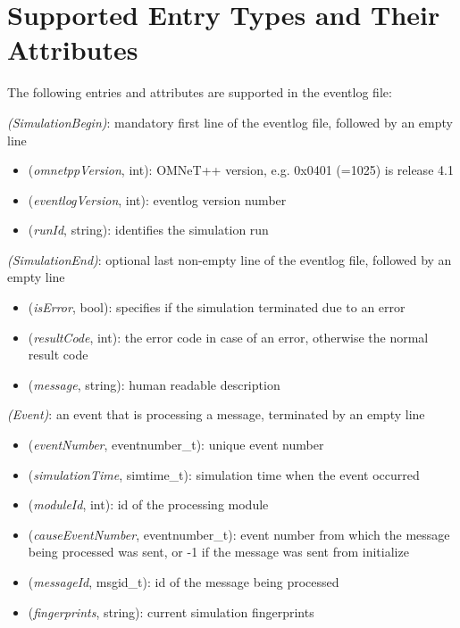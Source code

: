 \section{Supported Entry Types and Their Attributes}
\label{sec:eventlog-file-format:entry-types}

The following entries and attributes are supported in the eventlog file:



 \textit{(SimulationBegin)}: mandatory first line of the eventlog file, followed by an empty line

\begin{itemize}
  \item {} (\textit{omnetppVersion}, int): OMNeT++ version, e.g. 0x0401 (=1025) is release 4.1
  \item {} (\textit{eventlogVersion}, int): eventlog version number
  \item {} (\textit{runId}, string): identifies the simulation run
\end{itemize}

 \textit{(SimulationEnd)}: optional last non-empty line of the eventlog file, followed by an empty line

\begin{itemize}
  \item {} (\textit{isError}, bool): specifies if the simulation terminated due to an error
  \item {} (\textit{resultCode}, int): the error code in case of an error, otherwise the normal result code
  \item {} (\textit{message}, string): human readable description
\end{itemize}

 \textit{(Event)}: an event that is processing a message, terminated by an empty line

\begin{itemize}
  \item \tbf{\#} (\textit{eventNumber}, eventnumber\_t): unique event number
  \item {} (\textit{simulationTime}, simtime\_t): simulation time when the event occurred
  \item {} (\textit{moduleId}, int): id of the processing module
  \item {} (\textit{causeEventNumber}, eventnumber\_t): event number from which the message being processed was sent, or -1 if the message was sent from initialize
  \item {} (\textit{messageId}, msgid\_t): id of the message being processed
  \item {} (\textit{fingerprints}, string): current simulation fingerprints
\end{itemize}

